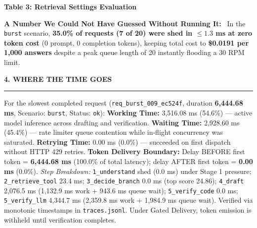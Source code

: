 \documentclass[10pt,a4paper]{article}
\newcommand{\secheader}[1]{\vspace{0.2em}\noindent\textbf{\small\MakeUppercase{#1}}\vspace{0.05em}\par\hrule\vspace{0.12em}}
\newcommand{\subhead}[1]{\noindent\textbf{#1}\ }
\begin{document}
\noindent\textbf{Table 3: Retrieval Settings Evaluation}\\[0.05em]

\vspace{0.1em}
\subhead{A Number We Could Not Have Guessed Without Running It:}
In the \texttt{burst} scenario, \textbf{35.0\% of requests (7 of 20) were shed in $\le 1.3$ ms at zero token cost} (0 prompt, 0 completion tokens), keeping total cost to \textbf{\$0.0191 per 1,000 answers} despite a peak queue length of 20 instantly flooding a 30 RPM limit.

\secheader{4. Where the Time Goes}
For the slowest completed request (\texttt{req\_burst\_009\_ec524f}, duration \textbf{6,444.68 ms}, Scenario: \texttt{burst}, Status: \texttt{ok}):
\textbf{Working Time:} 3,516.08 ms (54.6\%) — active model inference across drafting and verification.
\textbf{Waiting Time:} 2,928.60 ms (45.4\%) — rate limiter queue contention while in-flight concurrency was saturated.
\textbf{Retrying Time:} 0.00 ms (0.0\%) — succeeded on first dispatch without HTTP 429 retries.
\textbf{Token Delivery Boundary:} Delay BEFORE first token = \textbf{6,444.68 ms} (100.0\% of total latency); delay AFTER first token = \textbf{0.00 ms} (0.0\%).
\textit{Step Breakdown:} \texttt{1\_understand} shed (0.0 ms) under Stage 1 pressure; \texttt{2\_retrieve\_tool} 23.4 ms; \texttt{3\_decide\_branch} 0.0 ms (top score 24.86); \texttt{4\_draft} 2,076.5 ms (1,132.9 ms work + 943.6 ms queue wait); \texttt{5\_verify\_code} 0.0 ms; \texttt{5\_verify\_llm} 4,344.7 ms (2,359.8 ms work + 1,984.9 ms queue wait). Verified via monotonic timestamps in \texttt{traces.jsonl}. Under Gated Delivery, token emission is withheld until verification completes.
\end{document}
